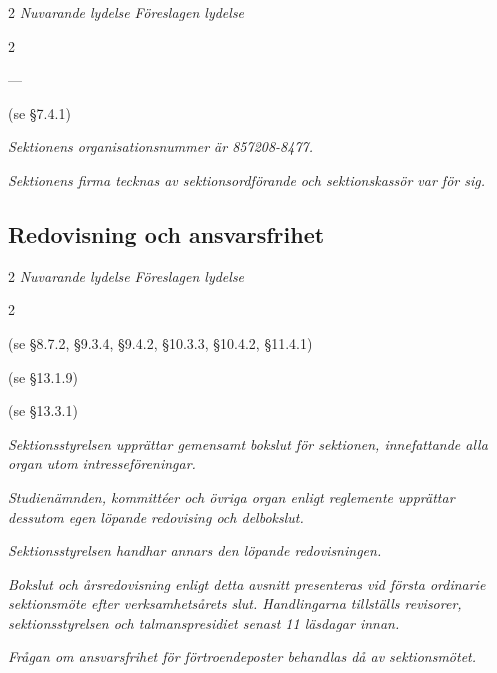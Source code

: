 \documentclass{article}
\newenvironment{lydelse}
    {\begin{paracol}{2}%
        \emph{Nuvarande lydelse}%
        \switchcolumn%
        \emph{Föreslagen lydelse}%
    \end{paracol}%
    \begin{enumerate}[label=\thesubsection.\arabic*]%
    \begin{paracol}{2}%
    }{\end{paracol}\end{enumerate}}
\begin{document}
\begin{lydelse}
  \item[] ---

  \item[] (se \S 7.4.1)
  
  \switchcolumn

  \item \emph{Sektionens organisationsnummer är 857208-8477.}

  \item \emph{Sektionens firma tecknas av sektionsordförande och sektionskassör var för sig.}
\end{lydelse}

\subsection{Redovisning och ansvarsfrihet}
\begin{lydelse}
  \item[] (se \S 8.7.2, \S 9.3.4, \S 9.4.2, \S 10.3.3, \S 10.4.2, \S 11.4.1)
  \item[] (se \S 13.1.9)
  \item[] (se \S 13.3.1)
  \switchcolumn
  \setcounter{enumi}{0}  
  \item \emph{Sektionsstyrelsen upprättar gemensamt bokslut för sektionen, innefattande alla organ utom intresseföreningar.}
  \item \emph{Studienämnden, kommittéer och övriga organ enligt reglemente upprättar dessutom egen löpande redovising och delbokslut.}
  \item \emph{Sektionsstyrelsen handhar annars den löpande redovisningen.}
  \item \emph{Bokslut och årsredovisning enligt detta avsnitt presenteras vid första ordinarie sektionsmöte efter verksamhetsårets slut.
      Handlingarna tillställs revisorer, sektionsstyrelsen och talmanspresidiet senast 11 läsdagar innan.} \label{14.x:tillställa}
  \item \emph{Frågan om ansvarsfrihet för förtroendeposter behandlas då av sektionsmötet.}
\end{lydelse}
\end{document}
